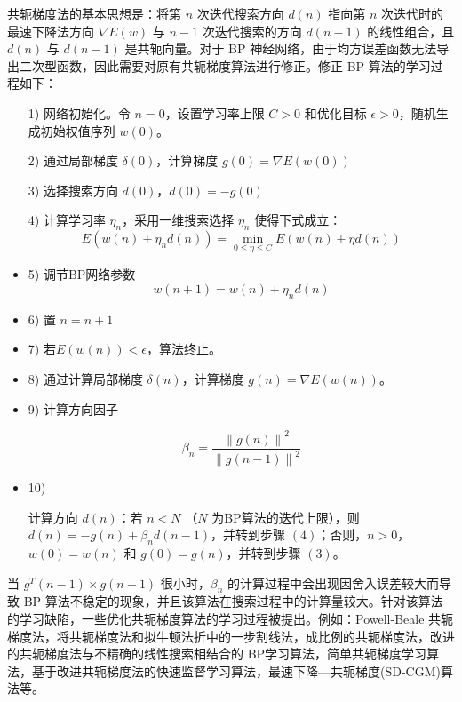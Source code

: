\documentclass[UTF8]{ctexart}
\begin{document}
共轭梯度法的基本思想是：将第  $n$ 次迭代搜索方向 $d(n)$ 指向第 $n$ 次迭代时的最速下降法方向 $\nabla E(w)$ 与 $n-1$ 次迭代搜索的方向 $d(n-1)$ 的线性组合，且 $d(n)$ 与 $d(n-1)$ 是共轭向量。对于 BP 神经网络，由于均方误差函数无法导出二次型函数，因此需要对原有共轭梯度算法进行修正。修正 BP 算法的学习过程如下： \par

\begin{itemize}
\item [1)]
网络初始化。令 $n = 0$，设置学习率上限 $C > 0$ 和优化目标 $\epsilon > 0$，随机生成初始权值序列 $w(0)$。
\item [2)]
通过局部梯度 $\delta (0)$，计算梯度 $g(0) = \nabla E(w(0))$
\item [3)]
选择搜索方向 $d(0)$，$d(0) = -g(0)$
\item [4)]
计算学习率 $\eta_n$，采用一维搜索选择 $\eta_n$ 使得下式成立：
\begin{equation}
E(w(n) + \eta_n d(n)) = \min \limits_{0 \le \eta \le C} E(w(n) + \eta d(n))
\end {equation}
\item [5)]
调节BP网络参数
\begin{equation}
w(n+1) = w(n) + \eta_n d(n)
\end {equation}

\item [6)]
置 $n = n + 1$

\item [7)]
若$E(w(n)) < \epsilon$，算法终止。

\item [8)]
通过计算局部梯度 $\delta(n)$，计算梯度 $g(n) = \nabla E(w(n))$。

\item [9)]
计算方向因子 

\begin{equation}
\beta_n = \frac{\left\lVert g(n) \right\rVert^2}{\left\lVert g(n-1) \right\rVert^2}
\end{equation}

\item [10)]

计算方向 $d(n)$：若 $n < N$ （$N$ 为BP算法的迭代上限），则 $d(n) = -g(n) + \beta_n d(n-1)$，并转到步骤 $(4)$；否则，$n > 0$，$w(0) = w(n)$ 和 $g(0) = g(n)$，并转到步骤 $(3)$。

\end{itemize}

当 $g^T(n-1) \times g(n-1)$ 很小时，$\beta_n$ 的计算过程中会出现因舍入误差较大而导致 BP 算法不稳定的现象，并且该算法在搜索过程中的计算量较大。针对该算法的学习缺陷，一些优化共轭梯度算法的学习过程被提出。例如：Powell-Beale 共轭梯度法，将共轭梯度法和拟牛顿法折中的一步割线法，成比例的共轭梯度法，改进的共轭梯度法与不精确的线性搜索相结合的 BP学习算法，简单共轭梯度学习算法，基于改进共轭梯度法的快速监督学习算法，最速下降—共轭梯度(SD-CGM)算法等。 \par
\end{document}

